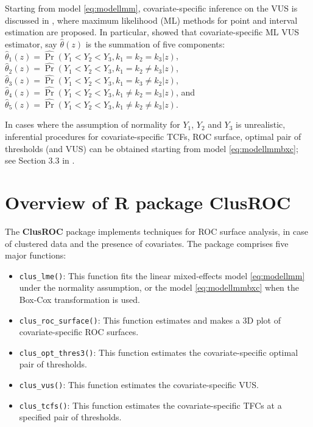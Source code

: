 Starting from model \eqref{eq:modellmm}, covariate-specific inference on the VUS is discussed in \citet{xiong2018estimating}, where maximum likelihood (ML) methods for point and interval estimation are proposed. In particular, \citet{xiong2018estimating} showed that covariate-specific ML VUS estimator, say $\hat{\theta}(z)$ is the summation of five components: $\hat{\theta}_1(z) = \widehat{\Pr}(Y_1 < Y_2 < Y_3, k_1 = k_2 = k_3|z)$, $\hat{\theta}_2(z) = \widehat{\Pr}(Y_1 < Y_2 < Y_3, k_1 = k_2 \ne k_3|z)$, $\hat{\theta}_3(z) = \widehat{\Pr}(Y_1 < Y_2 < Y_3, k_1 = k_3 \ne k_2|z)$, $\hat{\theta}_4(z) = \widehat{\Pr}(Y_1 < Y_2 < Y_3, k_1 \ne k_2 = k_3|z)$, and $\hat{\theta}_5(z) = \widehat{\Pr}(Y_1 < Y_2 < Y_3, k_1 \ne k_2 \ne k_3|z)$.

In cases where the assumption of normality for $Y_1$, $Y_2$ and $Y_3$ is unrealistic, inferential procedures for covariate-specific TCFs, ROC surface, optimal pair of thresholds (and VUS) can be obtained starting from model \eqref{eq:modellmmbxc}; see Section 3.3 in \citet{khanh2022}.

\hypertarget{overview-of-r-package-clusroc}{%
\section{Overview of R package
ClusROC}\label{overview-of-r-package-clusroc}}

The \textbf{ClusROC} package implements techniques for ROC surface analysis, in case of clustered data and the presence of covariates. The package comprises five major functions:
{
\begin{itemize}
\item \texttt{clus\_lme()}: This function fits the linear mixed-effects model \eqref{eq:modellmm} under the normality assumption, or the model \eqref{eq:modellmmbxc} when the Box-Cox transformation is used.
\item \texttt{clus\_roc\_surface()}: This function estimates and makes a 3D plot of covariate-specific ROC surfaces.
\item \texttt{clus\_opt\_thres3()}: This function estimates the covariate-specific optimal pair of thresholds.
\item \texttt{clus\_vus()}: This function estimates the covariate-specific VUS.
\item \texttt{clus\_tcfs()}: This function estimates the covariate-specific TFCs at a specified pair of thresholds.
\end{itemize}
}


